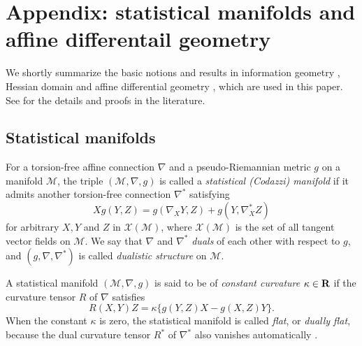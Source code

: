 \documentclass{llncs}
\begin{document}
\appendix

\section{Appendix: statistical manifolds and affine differentail geometry}
We shortly summarize the basic notions and results in information geometry 
\cite{Amari85,AN}, Hessian domain \cite{Shima07} 
and affine differential geometry \cite{NS,Kurose94}, 
which are used in this paper.
See for the details and proofs in the literature.

\subsection{Statistical manifolds}
For a torsion-free affine connection $\nabla$ and a pseudo-Riemannian 
metric $g$ on a manifold $\mathcal{M}$, the triple $(\mathcal{M},\nabla,g)$ 
is called a {\em statistical (Codazzi) manifold} if 
it admits another torsion-free connection $\nabla^*$ satisfying
\begin{equation}
 Xg(Y,Z)=g(\nabla_X Y, Z)+g(Y, \nabla^*_X Z)
\label{dualistic}
\end{equation}
for arbitrary $X,Y$ and $Z$ in ${\mathcal X}(\mathcal{M})$, where ${\mathcal X}(\mathcal{M})$ is the set of all tangent vector fields on $\mathcal{M}$.
We say that $\nabla$ and $\nabla^*$ {\em duals} of each other 
with respect to $g$, and $(g,\nabla,\nabla^*)$ is called 
{\em dualistic structure} on $\mathcal{M}$.

A statistical manifold $(\mathcal{M},\nabla,g)$ is said to be of 
{\em constant curvature} $\kappa \in {\bf R}$ 
if the curvature tensor $R$ of $\nabla$ satisfies
\begin{equation}
 R(X,Y)Z=\kappa \{g(Y,Z)X-g(X,Z)Y\}.
\label{smcc}
\end{equation}
When the constant $\kappa$ is zero, the statistical manifold is called
{\em flat}, or {\em dually flat}, because the dual curvature tensor $R^*$ 
of $\nabla^*$ also vanishes automatically \cite{AN,Shima07}.
\end{document}

